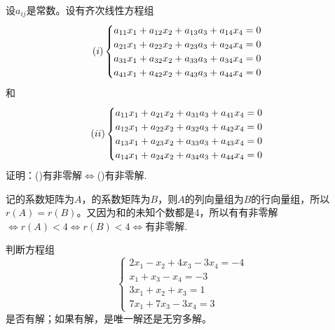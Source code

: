 \documentclass[a4paper]{report}
\begin{document}
\EX 设$a_{ij}$是常数。设有齐次线性方程组
\begin{equation*}
  (\uppercase\expandafter{\romannumeral1})
\begin{cases}
a_{11}x_1+a_{12}x_2+a_{13}a_3+a_{14}x_{4}=0\\
a_{21}x_1+a_{22}x_2+a_{23}a_3+a_{24}x_{4}=0\\
a_{31}x_1+a_{32}x_2+a_{33}a_3+a_{34}x_{4}=0\\
a_{41}x_1+a_{42}x_2+a_{43}a_3+a_{44}x_{4}=0
\end{cases}
\end{equation*}
和\begin{equation*}
  (\uppercase\expandafter{\romannumeral2})
\begin{cases}
a_{11}x_1+a_{21}x_2+a_{31}a_3+a_{41}x_{4}=0\\
a_{12}x_1+a_{22}x_2+a_{32}a_3+a_{42}x_{4}=0\\
a_{13}x_1+a_{23}x_2+a_{33}a_3+a_{43}x_{4}=0\\
a_{14}x_1+a_{24}x_2+a_{34}a_3+a_{44}x_{4}=0
\end{cases}
\end{equation*}
证明：(\uppercase\expandafter{})有非零解$\Leftrightarrow$(\uppercase\expandafter{})有非零解.

\begin{zhengming}
记\uppercase\expandafter{}的系数矩阵为$A$，\uppercase\expandafter{}的系数矩阵为$B$，则$A$的列向量组为$B$的行向量组，所以$r(A)=r(B)$。又因为\uppercase\expandafter{}和\uppercase\expandafter{}的未知个数都是4，所以有\uppercase\expandafter{}有非零解$\Leftrightarrow r(A)<4\Leftrightarrow r(B)<4 \Leftrightarrow$\uppercase\expandafter{}有非零解.
\end{zhengming}

\EX 判断方程组
\begin{equation*}
\begin{cases}
2x_1-x_2+4x_3-3x_4=-4\\
x_1+x_3-x_4=-3\\
3x_1+x_2+x_3=1\\
7x_1+7x_3-3x_4=3
\end{cases}
\end{equation*}
是否有解；如果有解，是唯一解还是无穷多解。
\end{document}
